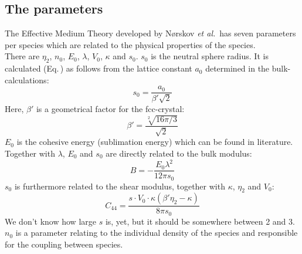 \documentclass[11pt,oneside,a4paper, captions=nooneline, headsepline]{article}%
\begin{document}
\subsection{The parameters}
The Effective Medium Theory developed by N\o rskov \emph{et al.}\,\cite{jacobsen96,emt80,emt82,emt87} has seven parameters per species which are related to the physical properties of the species.\\
There are $\eta_2$, $n_0$, $E_0$, $\lambda$, $V_0$, $\kappa$ and $s_0$.
$s_0$ is the neutral sphere radius. It is calculated (Eq.\,) as follows from the lattice constant $a_0$ determined in the bulk-calculations:
\begin{equation}
s_0 = \frac{a_0}{\beta' \sqrt{2}}
\end{equation}
Here, $\beta'$ is a geometrical factor for the fcc-crystal:
\begin{equation}
\beta' = \frac{\sqrt[2]{16 \pi /3}}{\sqrt{2}}
\end{equation}
$E_0$ is the cohesive energy (sublimation energy) which can be found in literature. 
Together with $\lambda$, $E_0$ and $s_0$ are directly related to the bulk modulus:\\
\begin{equation}
B = -\frac{E_0 \lambda^2}{12 \pi s_0}
\end{equation}
$s_0$ is furthermore related to the shear modulus, together with $\kappa$, $\eta_2$ and $V_0$:\\
\begin{equation}
C_{44} = \frac{s\cdot V_0\cdot \kappa (\beta'\eta_2-\kappa)}{8\pi s_0}
\label{c44}
\end{equation}
We don't know how large $s$ is, yet, but it should be somewhere between 2 and 3.\\
$n_0$ is a parameter relating to the individual density of the species and responsible for the coupling between species.\\
\end{document}
